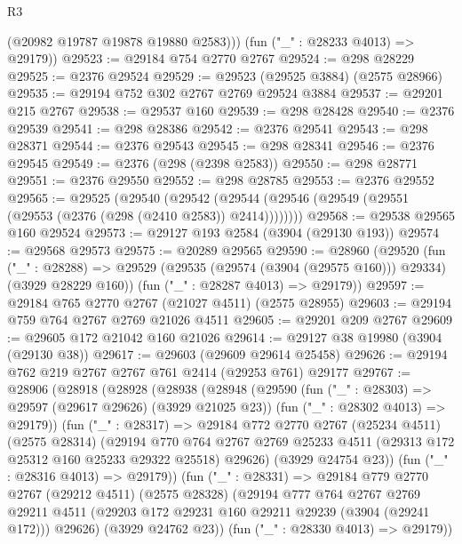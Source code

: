\begin{lexlean}{R3}
\begin{coremodule}
          (@20982 @19787 @19878 @19880 @2583)))
      (fun ("_" : @28233 @4013) => @29179))
@29523 := @29184 @754 @2770 @2767
@29524 := @298 @28229
@29525 := @2376 @29524
@29529 := @29523 (@29525 @3884) (@2575 @28966)
@29535 := @29194 @752 @302 @2767 @2769 @29524 @3884
@29537 := @29201 @215 @2767
@29538 := @29537 @160
@29539 := @298 @28428
@29540 := @2376 @29539
@29541 := @298 @28386
@29542 := @2376 @29541
@29543 := @298 @28371
@29544 := @2376 @29543
@29545 := @298 @28341
@29546 := @2376 @29545
@29549 := @2376 (@298 (@2398 @2583))
@29550 := @298 @28771
@29551 := @2376 @29550
@29552 := @298 @28785
@29553 := @2376 @29552
@29565 := @29525
    (@29540
      (@29542 (@29544 (@29546 (@29549 (@29551 (@29553 (@2376 (@298 (@2410 @2583)) @2414))))))))
@29568 := @29538 @29565 @160 @29524
@29573 := @29127 @193 @2584 (@3904 (@29130 @193))
@29574 := @29568 @29573
@29575 := @20289 @29565
@29590 := @28960
    (@29520
      (fun ("_" : @28288) =>
      @29529 (@29535 (@29574 (@3904 (@29575 @160))) @29334) (@3929 @28229 @160))
      (fun ("_" : @28287 @4013) => @29179))
@29597 := @29184 @765 @2770 @2767 (@21027 @4511) (@2575 @28955)
@29603 := @29194 @759 @764 @2767 @2769 @21026 @4511
@29605 := @29201 @209 @2767
@29609 := @29605 @172 @21042 @160 @21026
@29614 := @29127 @38 @19980 (@3904 (@29130 @38))
@29617 := @29603 (@29609 @29614 @25458)
@29626 := @29194 @762 @219 @2767 @2767 @761 @2414 (@29253 @761) @29177
@29767 := @28906
    (@28918
      (@28928
        (@28938
          (@28948
            (@29590
              (fun ("_" : @28303) => @29597 (@29617 @29626) (@3929 @21025 @23))
              (fun ("_" : @28302 @4013) => @29179))
            (fun ("_" : @28317) =>
            @29184
              @772
              @2770
              @2767
              (@25234 @4511)
              (@2575 @28314)
              (@29194
                @770
                @764
                @2767
                @2769
                @25233
                @4511
                (@29313 @172 @25312 @160 @25233 @29322 @25518)
                @29626)
              (@3929 @24754 @23))
            (fun ("_" : @28316 @4013) => @29179))
          (fun ("_" : @28331) =>
          @29184
            @779
            @2770
            @2767
            (@29212 @4511)
            (@2575 @28328)
            (@29194
              @777
              @764
              @2767
              @2769
              @29211
              @4511
              (@29203 @172 @29231 @160 @29211 @29239 (@3904 (@29241 @172)))
              @29626)
            (@3929 @24762 @23))
          (fun ("_" : @28330 @4013) => @29179))

\end{coremodule}
\end{lexlean}
